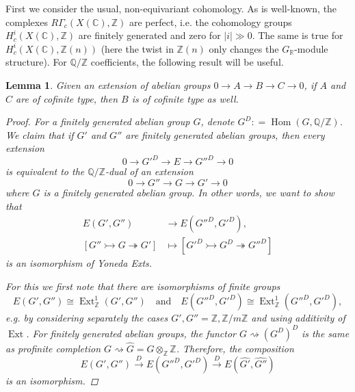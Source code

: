 \documentclass[leqno,12pt]{article}
\theoremstyle{plain}
\newtheorem{lemma}[theorem]{\indent\sc Lemma}
\theoremstyle{definition}
\DeclareMathOperator{\Hom}{Hom}
\DeclareMathOperator{\Ext}{Ext}
\newcommand{\CC}{\mathbb{C}}
\newcommand{\QQ}{\mathbb{Q}}
\newcommand{\RR}{\mathbb{R}}
\newcommand{\ZZ}{\mathbb{Z}}
\newcommand{\dfn}{\mathrel{\mathop:}=}
\begin{document}
First we consider the usual, non-equivariant cohomology. As is well-known, the
complexes $R\Gamma_c (X (\CC), \ZZ)$ are perfect, i.e. the cohomology groups
$H^i_c (X (\CC), \ZZ)$ are finitely generated and zero for $|i| \gg 0$.  The
same is true for $H^i_c (X (\CC), \ZZ (n))$ (here the twist in $\ZZ (n)$ only
changes the $G_\RR$-module structure). For $\QQ/\ZZ$ coefficients, the following
result will be useful.

\begin{lemma}
  \label{lemma:extensions-of-cofinite-type-groups}
  Given an extension of abelian groups
  $0 \to A \to B \to C \to 0$,
  if $A$ and $C$ are of cofinite type, then $B$ is of cofinite type as well.

  \begin{proof}
    For a finitely generated abelian group $G$, denote
    $G^D \dfn \Hom (G, \QQ/\ZZ)$.  We claim that if $G'$ and $G''$ are finitely
    generated abelian groups, then every extension
    $$0 \to G'^D \to E \to G''^D \to 0$$
    is equivalent to the $\QQ/\ZZ$-dual of an extension
    $$0 \to G'' \to G \to G' \to 0$$
    where $G$ is a finitely generated abelian group. In other words,
    we want to show that
    \begin{align*}
      E (G',G'') & \to E (G''^D,G'^D),\\
      [G'' \rightarrowtail G \twoheadrightarrow G'] & \mapsto
      [G'^D \rightarrowtail G^D \twoheadrightarrow G''^D]
    \end{align*}
    is an isomorphism of Yoneda Exts.

    For this we first note that there are isomorphisms of finite groups
    \[ E (G',G'') \cong \Ext_\ZZ^1 (G',G'')
      \quad\text{and}\quad
      E (G''^D, G'^D) \cong \Ext_\ZZ^1 (G''^D, G'^D), \]
    e.g. by considering separately the cases $G', G'' = \ZZ, \ZZ/m\ZZ$ and using
    additivity of $\Ext$. For finitely generated abelian groups, the functor
    $G \rightsquigarrow (G^D)^D$ is the same as profinite completion
    $G \rightsquigarrow \widehat{G} = G\otimes_\ZZ \widehat{\ZZ}$. Therefore,
    the composition
    \[ E (G',G'') \xrightarrow{D}
    E (G''^D,G'^D) \xrightarrow{D}
    E (\widehat{G'},\widehat{G''}) \]
    is an isomorphism.
  \end{proof}
\end{lemma}
\end{document}
